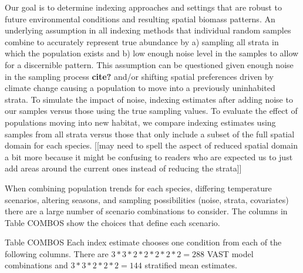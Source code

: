 \documentclass[
  12pt,
]{article}
\begin{document}
Our goal is to determine indexing approaches and settings that are robust to future environmental conditions and resulting spatial biomass patterns. An underlying assumption in all indexing methods that individual random samples combine to accurately represent true abundance by a) sampling all strata in which the population exists and b) low enough noise level in the samples to allow for a discernible pattern. This assumption can be questioned given enough noise in the sampling process \textbf{cite?} and/or shifting spatial preferences driven by climate change causing a population to move into a previously uninhabited strata. To simulate the impact of noise, indexing estimates after adding noise to our samples versus those using the true sampling values. To evaluate the effect of populations moving into new habitat, we compare indexing estimates using samples from all strata versus those that only include a subset of the full spatial domain for each species. {[}{[}may need to spell the aspect of reduced spatial domain a bit more because it might be confusing to readers who are expected us to just add areas around the current ones instead of reducing the strata{]}{]}

When combining population trends for each species, differing temperature scenarios, altering seasons, and sampling possibilities (noise, strata, covariates) there are a large number of scenario combinations to consider. The columns in Table COMBOS show the choices that define each scenario.

Table COMBOS Each index estimate chooses one condition from each of the following columns. There are \(3*3*2*2*2*2*2=288\) VAST model combinations and \(3*3*2*2*2=144\) stratified mean estimates.
\end{document}

